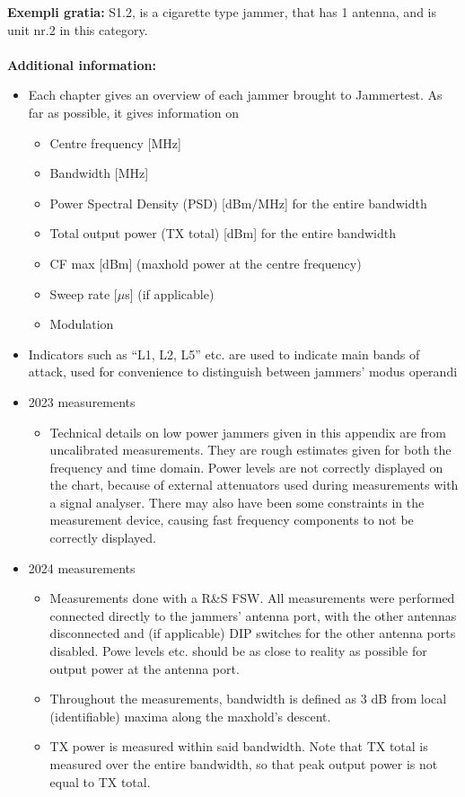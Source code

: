 \textbf{Exempli gratia:}
S1.2, is a cigarette type jammer, that has 1 antenna, and is unit nr.2 in this category.
\\
\\
\textbf{Additional information:}
\begin{itemize}
    \item Each chapter gives an overview of each jammer brought to Jammertest. As far as possible, it
gives information on
    \begin{itemize}
        \item Centre frequency [MHz]
        \item Bandwidth [MHz]
        \item Power Spectral Density (PSD) [dBm/MHz] for the entire bandwidth
        \item Total output power (TX total) [dBm] for the entire bandwidth
        \item CF max [dBm] (maxhold power at the centre frequency)
        \item Sweep rate [$\mu$s] (if applicable)
        \item Modulation
    \end{itemize}
    \item Indicators such as “L1, L2, L5” etc. are used to indicate main bands of attack, used for
convenience to distinguish between jammers' modus operandi
\item 2023 measurements
    \begin{itemize}
        \item Technical details on low power jammers given in this appendix are from uncalibrated
        measurements. They are rough estimates given for both the frequency and time
        domain. Power levels are not correctly displayed on the chart, because of external
        attenuators used during measurements with a signal analyser. There may also have
        been some constraints in the measurement device, causing fast frequency
        components to not be correctly displayed.
    \end{itemize}
    \item 2024 measurements
    \begin{itemize}
        \item Measurements done with a R\&S FSW. All measurements were performed connected
        directly to the jammers' antenna port, with the other antennas disconnected and (if
        applicable) DIP switches for the other antenna ports disabled. Powe levels etc. should
        be as close to reality as possible for output power at the antenna port.
        \item Throughout the measurements, bandwidth is defined as 3 dB from local (identifiable)
        maxima along the maxhold's descent.
        \item TX power is measured within said bandwidth. Note that TX total is measured over the
        entire bandwidth, so that peak output power is not equal to TX total.
    \end{itemize}
\end{itemize}

